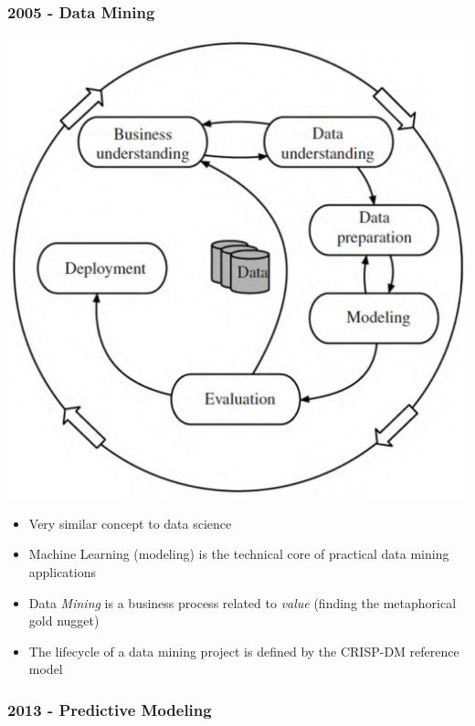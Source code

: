 \documentclass[a4paper]{article}
\begin{document}
			\subsubsection{2005 - Data Mining}
			
			\begin{minipage}[c]{0.3\textwidth}
				\centering
				\includegraphics[width=\textwidth]{img/sw01/data-mining.png}
			\end{minipage}
			\hfill
			\begin{minipage}[c]{0.6\textwidth}
				\begin{itemize}
					\item Very similar concept to data science
					\item Machine Learning (modeling) is the technical core of practical data mining applications
					\item Data \textit{Mining} is a business process related to \textit{value} (finding the metaphorical gold nugget)
					\item The lifecycle of a data mining project is defined by the CRISP-DM reference model
				\end{itemize}
			\end{minipage}
		
			\subsubsection{2013 - Predictive Modeling}
			
\end{document}
